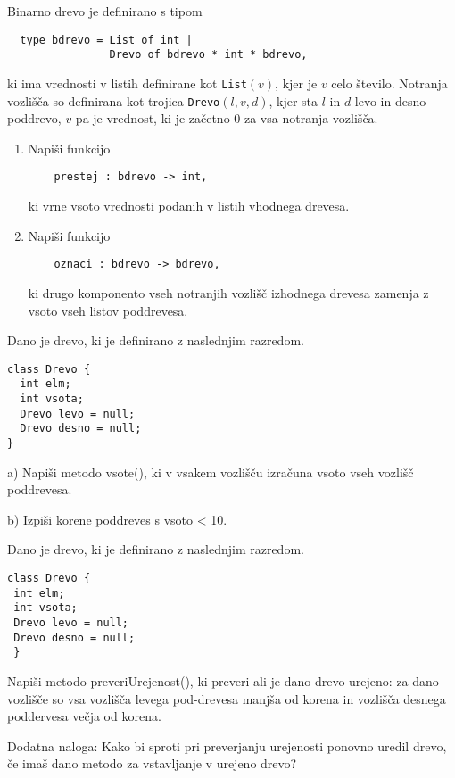 \begin{ex}
  Binarno drevo je definirano s tipom
  \begin{lstlisting}
  type bdrevo = List of int |
                Drevo of bdrevo * int * bdrevo,
  \end{lstlisting}
  ki ima vrednosti v listih definirane kot \lstinline{List}$(v)$, kjer je
  $v$ celo \v stevilo.  Notranja vozli\v s\v ca so definirana kot
  trojica \lstinline{Drevo}$(l, v, d)$, kjer sta $l$ in $d$ levo in desno
  poddrevo, $v$ pa je vrednost, ki je za\v cetno $0$ za vsa notranja
  vozli\v s\v ca.

  \begin{enumerate}[label=(\roman*)]
  \item Napi\v si funkcijo
    \begin{lstlisting}
    prestej : bdrevo -> int, 
    \end{lstlisting}
    ki vrne vsoto vrednosti podanih v listih vhodnega drevesa.

  \item Napi\v si funkcijo
    \begin{lstlisting}
    oznaci : bdrevo -> bdrevo,
    \end{lstlisting}
    ki drugo komponento vseh notranjih vozli\v s\v c izhodnega drevesa
    zamenja z vsoto vseh listov poddrevesa.
  \end{enumerate}


\end{ex} 
\begin{ex}
Dano je drevo, ki je definirano z naslednjim razredom.

\begin{lstlisting}
class Drevo {
  int elm;
  int vsota;
  Drevo levo = null;
  Drevo desno = null;
}
\end{lstlisting}

a) Napi\v si metodo vsote(), ki v vsakem vozli\v s\v cu izra\v cuna vsoto vseh vozli\v s\v c poddrevesa.

b) Izpi\v si korene poddreves s vsoto < 10.



\end{ex}
\begin{ex}
Dano je drevo, ki je definirano z naslednjim razredom.

\begin{lstlisting}
class Drevo {
 int elm;
 int vsota;
 Drevo levo = null;
 Drevo desno = null;
 }
\end{lstlisting}

Napi\v si metodo preveriUrejenost(), ki preveri ali je dano drevo urejeno: za dano vozli\v s\v ce so vsa vozli\v s\v ca levega pod-drevesa manj\v sa od korena in vozli\v s\v ca desnega poddervesa ve\v cja od korena. 

Dodatna naloga: Kako bi sproti pri preverjanju urejenosti ponovno uredil drevo, \v ce ima\v s dano metodo za vstavljanje v urejeno drevo?
\end{ex}
